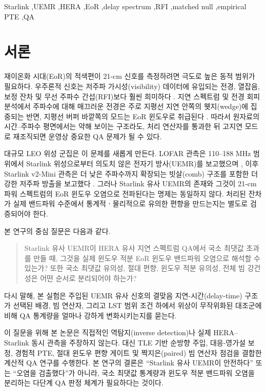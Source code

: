 \documentclass[final,5p,times]{elsarticle}
\begin{document}
\begin{frontmatter}
\begin{keyword}
Starlink \sep UEMR \sep HERA \sep EoR \sep delay spectrum \sep RFI \sep matched null \sep empirical PTE \sep QA
\end{keyword}

\end{frontmatter}


\section{서론}
\label{sec:intro}

재이온화 시대(EoR)의 적색편이 21-cm 신호를 측정하려면 극도로 높은 동적 범위가 필요하다.
우주론적 신호는 저주파 가시성(visibility) 데이터에 유입되는 전경, 열잡음, 보정 잔차 및
무선 주파수 간섭(RFI)보다 훨씬 희미하다 \citep{morales2010,deboer2017,abdurashidova2022}.
지연 스펙트럼 및 전경 회피 분석에서 주파수에 대해 매끄러운 전경은 주로 지평선 지연 안쪽의
웻지(wedge)에 집중되는 반면, 지평선 버퍼 바깥쪽의 모드는 EoR 윈도우로 취급된다
\citep{parsons2012delay,liu2014wedge,thyagarajan2015}. 따라서 원자료의 시간--주파수 평면에서는
약해 보이는 구조라도, 처리 연산자를 통과한 뒤 고지연 모드로 재조직되면 운영상 중요한 QA 문제가
될 수 있다.

대규모 LEO 위성 군집은 이 문제를 새롭게 만든다. LOFAR 관측은 110--188 MHz 범위에서
Starlink 위성으로부터 의도치 않은 전자기 방사(UEMR)를 보고했으며 \citep{divruno2023}, 이후
Starlink v2-Mini 관측은 더 낮은 주파수까지 확장되는 빗살(comb) 구조를 포함한 더 강한 저주파 방출을
보고했다 \citep{bassa2024}. 그러나 Starlink 유사 UEMR의 존재와 그것이 21-cm 파워 스펙트럼의
EoR 윈도우 오염으로 전파된다는 명제는 동일하지 않다. 처리된 잔차가 실제 밴드파워
수준에서 통계적ㆍ물리적으로 유의한 편향을 만드는지는 별도로 검증되어야 한다.

본 연구의 중심 질문은 다음과 같다.
\begin{quote}
Starlink 유사 UEMR이 HERA 유사 지연 스펙트럼 QA에서 국소 최댓값 초과를 만들 때, 그것을
실제 윈도우 적분 EoR 윈도우 밴드파워 오염으로 해석할 수 있는가? 또한 국소 최댓값
유의성, 절대 편향, 윈도우 적분 유의성, 전체 빔 강건성은 어떤 순서로
분리되어야 하는가?
\end{quote}

다시 말해, 본 실험은 주입된 UEMR 유사 신호의 결맞음 지연-시간(delay-time) 구조가 선택된 배경, 빔 연산자, 그리고 LST 범위 조건 하에서 위상이 무작위화된 대조군에 비해 QA 통계량을 얼마나 강하게 변화시키는지를 묻는다.

이 질문을 위해 본 논문은 직접적인 역탐지(inverse detection)나 실제 HERA--Starlink 동시 관측을 주장하지 않는다.
대신 TLE 기반 순방향 주입, 대응-영가설 보정, 경험적 PTE, 절대 윈도우 편향 게이트 및
짝지은(paired) 빔 연산자 점검을 결합한 계산적 QA 연구를 수행한다. 본 연구의 결론은 ``Starlink
유사 UEMR이 안전하다'' 또는 ``오염을 검출했다''가 아니라, 국소 최댓값 통계량과 윈도우 적분 밴드파워
오염을 분리하는 다단계 QA 판정 체계가 필요하다는 것이다.
\end{document}
